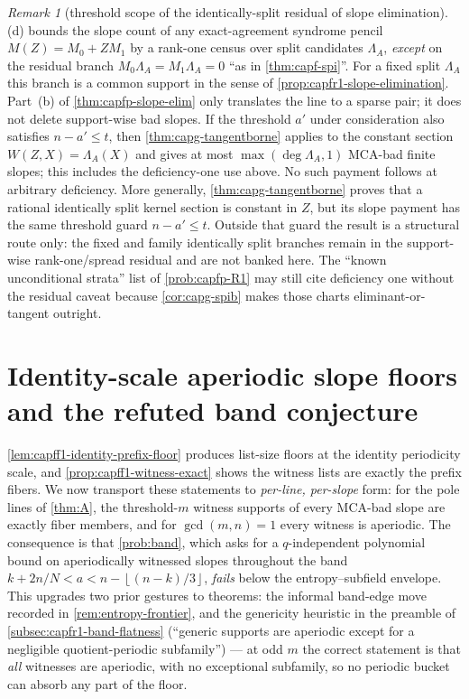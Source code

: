 \documentclass[11pt]{article}
\theoremstyle{definition}
\theoremstyle{remark}
\newtheorem{remark}[remark]{Remark}
\providecommand{\floor}[1]{\left\lfloor #1\right\rfloor}
\begin{document}
\begin{remark}[threshold scope of the identically-split residual of slope
elimination]\label{rem:capg-slopeelim-closure}
\textup{(d)} bounds the slope count of any
exact-agreement syndrome pencil $M(Z)=M_0+ZM_1$ by a rank-one census over
split candidates $\Lambda_A$, \emph{except} on the residual branch
$M_0\Lambda_A=M_1\Lambda_A=0$ ``as in \cref{thm:capf-spi}''.  For a fixed
split $\Lambda_A$ this branch is a common support in the sense of
\cref{prop:capfr1-slope-elimination}.  Part~\textup{(b)} of
\cref{thm:capfp-slope-elim} only translates the line to a sparse pair; it
does not delete support-wise bad slopes.  If the threshold $a'$ under
consideration also satisfies $n-a'\le t$, then
\cref{thm:capg-tangentborne} applies to the constant section
$W(Z,X)=\Lambda_A(X)$ and gives at most
$\max(\deg\Lambda_A,1)$ MCA-bad finite slopes; this includes the
deficiency-one use above.  No such payment follows at arbitrary deficiency.
More generally, \cref{thm:capg-tangentborne} proves that a rational
identically split kernel section is constant in $Z$, but its slope payment
has the same threshold guard $n-a'\le t$.  Outside that guard the result is
a structural route only: the fixed and family identically split branches
remain in the support-wise rank-one/spread residual and are not banked here.
The ``known unconditional strata'' list of \cref{prob:capfp-R1} may still
cite deficiency one without the residual caveat because
\cref{cor:capg-spib} makes those charts eliminant-or-tangent outright.
\end{remark}

\section{Identity-scale aperiodic slope floors and the refuted band
conjecture}\label{sec:capg-floors}

\cref{lem:capff1-identity-prefix-floor} produces list-size floors at the
identity periodicity scale, and \cref{prop:capff1-witness-exact} shows the
witness lists are exactly the prefix fibers.  We now transport these
statements to \emph{per-line, per-slope} form: for the pole lines of
\cref{thm:A}, the threshold-$m$ witness supports of every MCA-bad slope
are exactly fiber members, and for $\gcd(m,n)=1$ every witness is
aperiodic.  The consequence is that \cref{prob:band}, which asks for a
$q$-independent polynomial bound on aperiodically witnessed slopes
throughout the band $k+2n/N<a<n-\floor{(n-k)/3}$, \emph{fails} below the
entropy--subfield envelope.  This upgrades two prior gestures to
theorems: the informal band-edge move recorded in
\cref{rem:entropy-frontier}, and the genericity heuristic in the preamble
of \cref{subsec:capfr1-band-flatness} (``generic supports are aperiodic
except for a negligible quotient-periodic subfamily'') --- at odd $m$ the
correct statement is that \emph{all} witnesses are aperiodic, with no
exceptional subfamily, so no periodic bucket can absorb any part of the
floor.
\end{document}
